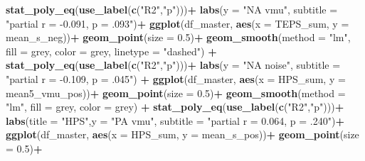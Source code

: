 \documentclass[
]{article}
\newenvironment{Shaded}{\begin{snugshade}}{\end{snugshade}}
\newcommand{\AttributeTok}[1]{\textcolor[rgb]{0.13,0.29,0.53}{#1}}
\newcommand{\FloatTok}[1]{\textcolor[rgb]{0.00,0.00,0.81}{#1}}
\newcommand{\FunctionTok}[1]{\textcolor[rgb]{0.13,0.29,0.53}{\textbf{#1}}}
\newcommand{\NormalTok}[1]{#1}
\newcommand{\SpecialCharTok}[1]{\textcolor[rgb]{0.81,0.36,0.00}{\textbf{#1}}}
\newcommand{\StringTok}[1]{\textcolor[rgb]{0.31,0.60,0.02}{#1}}
\begin{document}
\begin{Shaded}
\begin{Highlighting}[]
  \FunctionTok{stat\_poly\_eq}\NormalTok{(}\FunctionTok{use\_label}\NormalTok{(}\FunctionTok{c}\NormalTok{(}\StringTok{"R2"}\NormalTok{,}\StringTok{"p"}\NormalTok{)))}\SpecialCharTok{+}
  \FunctionTok{labs}\NormalTok{(}\AttributeTok{y =} \StringTok{"NA vmu"}\NormalTok{,}
       \AttributeTok{subtitle =} \StringTok{"partial r = {-}0.091, p = .093"}\NormalTok{)}\SpecialCharTok{+}
\FunctionTok{ggplot}\NormalTok{(df\_master, }\FunctionTok{aes}\NormalTok{(}\AttributeTok{x =}\NormalTok{ TEPS\_sum, }\AttributeTok{y =}\NormalTok{ mean\_s\_neg))}\SpecialCharTok{+}
  \FunctionTok{geom\_point}\NormalTok{(}\AttributeTok{size =} \FloatTok{0.5}\NormalTok{)}\SpecialCharTok{+}
  \FunctionTok{geom\_smooth}\NormalTok{(}\AttributeTok{method =} \StringTok{"lm"}\NormalTok{, }\AttributeTok{fill =} \StringTok{\textquotesingle{}grey\textquotesingle{}}\NormalTok{, }\AttributeTok{color =} \StringTok{\textquotesingle{}grey\textquotesingle{}}\NormalTok{, }\AttributeTok{linetype =} \StringTok{"dashed"}\NormalTok{) }\SpecialCharTok{+}
  \FunctionTok{stat\_poly\_eq}\NormalTok{(}\FunctionTok{use\_label}\NormalTok{(}\FunctionTok{c}\NormalTok{(}\StringTok{"R2"}\NormalTok{,}\StringTok{"p"}\NormalTok{)))}\SpecialCharTok{+}
  \FunctionTok{labs}\NormalTok{(}\AttributeTok{y =} \StringTok{"NA noise"}\NormalTok{,}
       \AttributeTok{subtitle =} \StringTok{"partial r = {-}0.109, p = .045"}\NormalTok{) }\SpecialCharTok{+} 
\FunctionTok{ggplot}\NormalTok{(df\_master, }\FunctionTok{aes}\NormalTok{(}\AttributeTok{x =}\NormalTok{ HPS\_sum, }\AttributeTok{y =}\NormalTok{ mean5\_vmu\_pos))}\SpecialCharTok{+}
  \FunctionTok{geom\_point}\NormalTok{(}\AttributeTok{size =} \FloatTok{0.5}\NormalTok{)}\SpecialCharTok{+}
  \FunctionTok{geom\_smooth}\NormalTok{(}\AttributeTok{method =} \StringTok{"lm"}\NormalTok{, }\AttributeTok{fill =} \StringTok{\textquotesingle{}grey\textquotesingle{}}\NormalTok{, }\AttributeTok{color =} \StringTok{\textquotesingle{}grey\textquotesingle{}}\NormalTok{) }\SpecialCharTok{+}
  \FunctionTok{stat\_poly\_eq}\NormalTok{(}\FunctionTok{use\_label}\NormalTok{(}\FunctionTok{c}\NormalTok{(}\StringTok{"R2"}\NormalTok{,}\StringTok{"p"}\NormalTok{)))}\SpecialCharTok{+}
  \FunctionTok{labs}\NormalTok{(}\AttributeTok{title =} \StringTok{"HPS"}\NormalTok{,}\AttributeTok{y =} \StringTok{"PA vmu"}\NormalTok{,}
       \AttributeTok{subtitle =} \StringTok{"partial r = 0.064, p = .240"}\NormalTok{)}\SpecialCharTok{+}
\FunctionTok{ggplot}\NormalTok{(df\_master, }\FunctionTok{aes}\NormalTok{(}\AttributeTok{x =}\NormalTok{ HPS\_sum, }\AttributeTok{y =}\NormalTok{ mean\_s\_pos))}\SpecialCharTok{+}
  \FunctionTok{geom\_point}\NormalTok{(}\AttributeTok{size =} \FloatTok{0.5}\NormalTok{)}\SpecialCharTok{+}

\end{Highlighting}
\end{Shaded}
\end{document}
